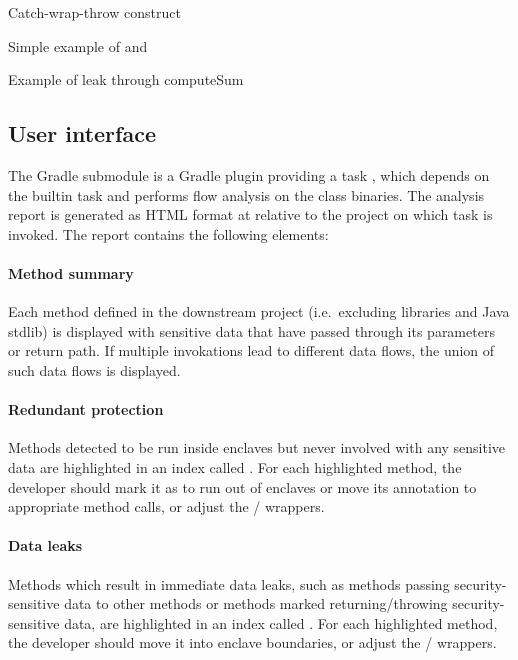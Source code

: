 {Catch-wrap-throw construct}


{Simple example of  and }

{Example of leak through computeSum}

\subsection{User interface}\label{subsec:user-interface}
The  Gradle submodule
is a Gradle plugin providing a task ,
which depends on the  builtin task
and performs flow analysis on the class binaries.
The analysis report is generated as HTML format at
relative to the project on which task is invoked.
The report contains the following elements:

\paragraph{Method summary}
Each method defined in the downstream project (i.e.\ excluding libraries and Java stdlib)
is displayed with sensitive data that have passed through its parameters or return path.
If multiple invokations lead to different data flows,
the union of such data flows is displayed.

\paragraph{Redundant protection}
Methods detected to be run inside enclaves but never involved with any sensitive data
are highlighted in an index called .
For each highlighted method, the developer
should mark it as  to run out of enclaves
or move its  annotation to appropriate method calls,
or adjust the / wrappers.

\paragraph{Data leaks}
Methods which result in immediate data leaks,
such as methods passing security-sensitive data to other  methods
or methods marked  returning/throwing security-sensitive data,
are highlighted in an index called .
For each highlighted method, the developer
should move it into enclave boundaries,
or adjust the / wrappers.

